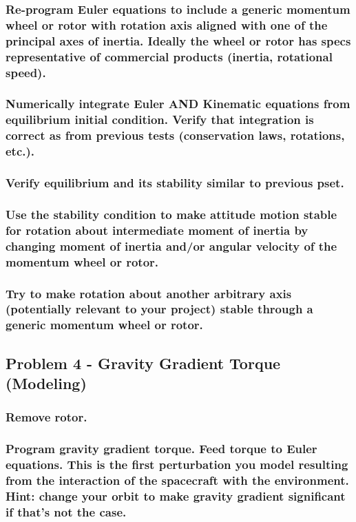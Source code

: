 \subsubsection{Re-program Euler equations to include a generic momentum wheel or rotor with rotation axis
aligned with one of the principal axes of inertia. Ideally the wheel or rotor has specs representative
of commercial products (inertia, rotational speed).}

\subsubsection{Numerically integrate Euler AND Kinematic equations from equilibrium initial condition. Verify
that integration is correct as from previous tests (conservation laws, rotations, etc.).}

\subsubsection{Verify equilibrium and its stability similar to previous pset.}

\subsubsection{Use the stability condition to make attitude motion stable for rotation about intermediate moment
of inertia by changing moment of inertia and/or angular velocity of the momentum wheel or rotor.}

\subsubsection{Try to make rotation about another arbitrary axis (potentially relevant to your project) stable
through a generic momentum wheel or rotor.}

\subsection{Problem 4 - Gravity Gradient Torque (Modeling)}

\subsubsection{Remove rotor.}

\subsubsection{Program gravity gradient torque. Feed torque to Euler equations. This is the first perturbation you
model resulting from the interaction of the spacecraft with the environment. Hint: change your orbit
to make gravity gradient significant if that’s not the case.}

